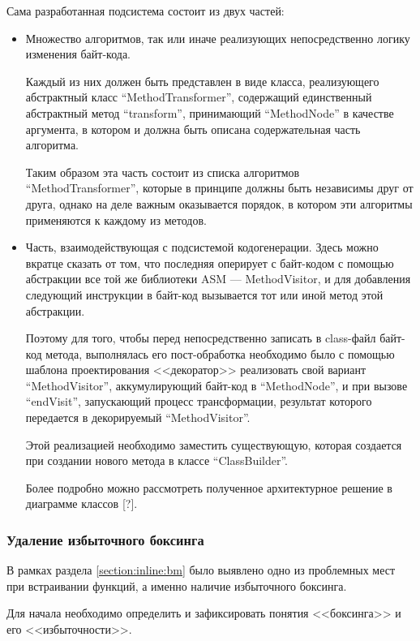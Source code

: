 Сама разработанная подсистема состоит из двух частей:
\begin{itemize}
    \item Множество алгоритмов, так или иначе реализующих непосредственно логику изменения
    байт-кода.

    Каждый из них должен быть представлен в виде класса, реализующего абстрактный класс
    ``MethodTransformer'', содержащий единственный абстрактный метод ``transform'', принимающий
    ``MethodNode'' в качестве аргумента, в котором и должна быть описана содержательная часть
    алгоритма.

    Таким образом эта часть состоит из списка алгоритмов ``MethodTransformer'', которые в принципе
    должны быть независимы друг от друга, однако на деле важным оказывается порядок, в котором
    эти алгоритмы применяются к каждому из методов.

    \item Часть, взаимодействующая с подсистемой кодогенерации.
    Здесь можно вкратце сказать от том, что последняя оперирует с байт-кодом с помощью абстракции
    все той же библиотеки ASM --- MethodVisitor, и для добавления следующий инструкции в байт-код
    вызывается тот или иной метод этой абстракции.

    Поэтому для того, чтобы перед непосредственно записать в class-файл байт-код метода,
    выполнялась его пост-обработка необходимо было с помощью шаблона проектирования
    <<декоратор>>\cite{Gamma} реализовать свой вариант ``MethodVisitor'', аккумулирующий байт-код
    в ``MethodNode'', и при вызове ``endVisit'', запускающий процесс трансформации, результат
    которого передается в декорируемый ``MethodVisitor''.

    Этой реализацией необходимо заместить существующую, которая создается при создании нового метода
    в классе ``ClassBuilder''.

    Более подробно можно рассмотреть полученное архитектурное решение в диаграмме классов [?]. %
\end{itemize}

\subsubsection{Удаление избыточного боксинга}
В рамках раздела \ref{section:inline:bm} было выявлено одно из проблемных мест при встраивании
функций, а именно наличие избыточного боксинга.

Для начала необходимо определить и зафиксировать понятия <<боксинга>> и его <<избыточности>>.

